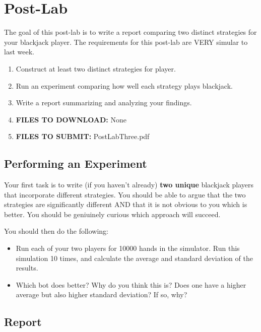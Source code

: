 \documentclass[paper=a4, fontsize=11pt, parskip=full]{scrartcl} %
\numberwithin{equation}{section} %
\numberwithin{figure}{section} %
\numberwithin{table}{section} %
\begin{document}


\newpage
\section{Post-Lab}

The goal of this post-lab is to write a report comparing two distinct strategies for your blackjack player. The requirements for this post-lab are VERY simular to last week. 

\begin{enumerate}
	\item Construct at least two distinct strategies for player. 
	\item Run an experiment comparing how well each strategy plays blackjack.
	\item Write a report summarizing and analyzing your findings.
	\item \textbf{FILES TO DOWNLOAD:} None
	\item \textbf{FILES TO SUBMIT:} PostLabThree.pdf
\end{enumerate}

\subsection{Performing an Experiment}

Your first task is to write (if you haven't already) \textbf{two unique} blackjack players that incorporate different strategies. You should be able to argue that the two strategies are significantly different AND that it is not obvious to you which is better. You should be geniuinely curious which approach will succeed.

You should then do the following:

\begin{itemize}
	\item Run each of your two players for 10000 hands in the simulator. Run this simulation 10 times, and calculate the average and standard deviation of the results.
	\item Which bot does better? Why do you think this is? Does one have a higher average but also higher standard deviation? If so, why?
\end{itemize}

\subsection{Report}
\end{document}
